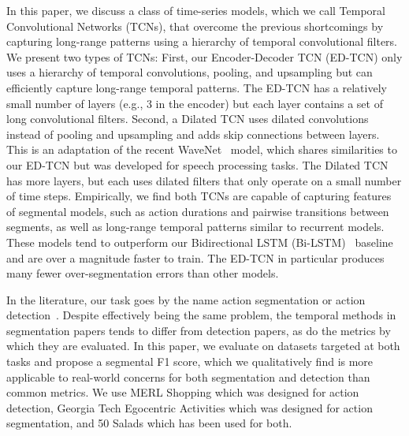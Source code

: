 \documentclass[10pt,twocolumn,letterpaper]{article}
\begin{document}
In this paper, we discuss a class of time-series models, which we call Temporal Convolutional Networks (TCNs), 
that overcome the previous shortcomings by capturing long-range patterns using a hierarchy of temporal convolutional filters. 
We present two types of TCNs:
First, our Encoder-Decoder TCN (ED-TCN)
only uses a hierarchy of temporal convolutions, pooling, and upsampling but can efficiently capture long-range temporal patterns.
The ED-TCN has a relatively small number of layers (e.g., 3 in the encoder) but each layer contains a set of long convolutional filters.
Second, a Dilated TCN uses dilated convolutions instead of pooling and upsampling and adds skip connections between layers.
This is an adaptation of the recent WaveNet~\cite{wavenet} model, which shares similarities to our ED-TCN but was developed for speech processing tasks.
The Dilated TCN has more layers, but each uses dilated filters that only operate on a small number of time steps.
Empirically, we find both TCNs are capable of capturing features of segmental models, such as action durations and pairwise transitions between segments, as well as long-range temporal patterns similar to recurrent models. 
These models tend to outperform our Bidirectional LSTM (Bi-LSTM)~\cite{bi_lstm} baseline and are over a magnitude faster to train. 
The ED-TCN in particular produces many fewer over-segmentation errors than other models. 


















In the literature, our task goes by the name action segmentation \cite{fathi_cvpr_2013,fathi_cvpr_2011,fathi_iccv_2011,kuehne_wacv_2016,singh_cvpr_2016_ego,lea_eccv_2016,huang_eccv_2016} or action detection~\cite{singh_cvpr_2016_merl,ni_cvpr_2014,ni_cvpr_2016,richard_cvpr_2016}. 
Despite effectively being the same problem, the temporal methods in segmentation papers tends to differ from detection papers, as do the metrics by which they are evaluated. 
In this paper, we evaluate on datasets targeted at both tasks and propose a segmental F1 score, which we qualitatively find is more applicable to real-world concerns for both segmentation and detection than common metrics. 
We use MERL Shopping which was designed for action detection, Georgia Tech Egocentric Activities which was designed for action segmentation, and 50 Salads which has been used for both.  
\end{document}
